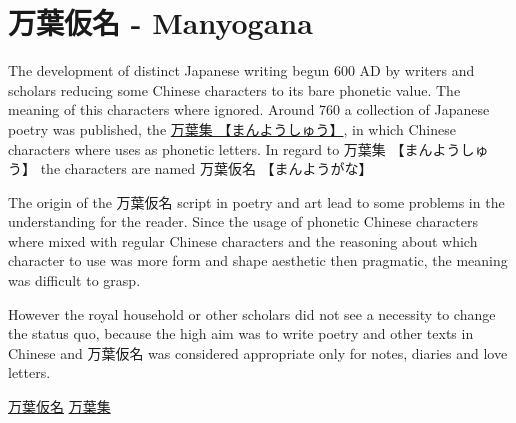 \section{万葉仮名 - Manyogana} \label{sec:Manyogana}

The development of distinct Japanese writing begun 600 AD by writers and
scholars reducing some Chinese characters to its bare phonetic value. The
meaning of this characters where ignored. Around 760 a collection of Japanese
poetry was published, the \Link
\href{http://en.wikipedia.org/wiki/Man%27y%C5%8Dsh%C5%AB}{万葉集
【まんようしゅう】}, in which Chinese characters where uses as phonetic
letters. In regard to {万葉集} {【まんようしゅう】} the characters are named
{万葉仮名} {【まんようがな】}

The origin of the {万葉仮名} script in poetry and art lead to some problems in
the understanding for the reader. Since the usage of phonetic Chinese
characters where mixed with regular Chinese characters and the reasoning about
which character to use was more form and shape aesthetic then pragmatic, the
meaning was difficult to grasp.

However the royal household or other scholars did not see a necessity to change
the status quo, because the high aim was to write poetry and other texts in
Chinese and {万葉仮名} was considered appropriate only for notes, diaries and
love letters.




\Link \href{http://en.wikipedia.org/wiki/Manyogana}{万葉仮名}
\Link \href{http://en.wikipedia.org/wiki/Man%27y%C5%8Dsh%C5%AB}{万葉集}

